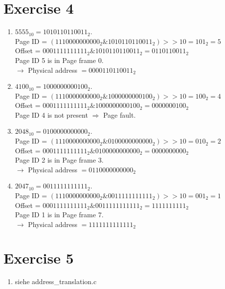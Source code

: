 \documentclass[a4paper,10pt]{article}
\begin{document}
\section*{Exercise 4}
\begin{enumerate}
 \item $5555_10 = 1010110110011_2$. \\
 Page ID = $(1110000000000_2 \& 1010110110011_2) >> 10 = 101_2 = 5$ \\
 Offset = $0001111111111_2 \& 1010110110011_2  = 0110110011_2$ \\
 Page ID 5 is in Page frame 0. \\
 $\rightarrow$ Physical address $= 000 0110110011_2$
 
 \item $4100_10 = 1000000000100_2$. \\
 Page ID = $(1110000000000_2 \& 1000000000100_2) >> 10 = 100_2 = 4$ \\
 Offset = $0001111111111_2 \& 1000000000100_2  = 0000000100_2$ \\
 Page ID 4 is not present $\Rightarrow$ Page fault. 
 
  \item $2048_10 = 0100000000000_2$. \\
 Page ID = $(1110000000000_2 \& 0100000000000_2) >> 10 = 010_2 = 2$ \\
 Offset = $0001111111111_2 \& 0100000000000_2  = 0000000000_2$ \\
 Page ID 2 is in Page frame 3. \\
 $\rightarrow$ Physical address $= 011 0000000000_2$
 
  \item $2047_10 = 0011111111111_2$. \\
 Page ID = $(1110000000000_2 \& 0011111111111_2) >> 10 = 001_2 = 1$ \\
 Offset = $0001111111111_2 \& 0011111111111_2  = 1111111111_2$ \\
 Page ID 1 is in Page frame 7. \\
 $\rightarrow$ Physical address $= 111 1111111111_2$
 \end{enumerate}


\section*{Exercise 5}
\begin{enumerate}
 \item siehe address\_translation.c

\end{enumerate}
\end{document}
